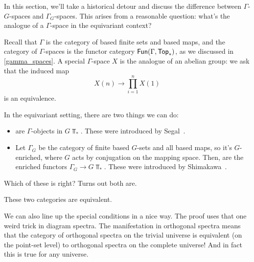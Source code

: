 \label{equivariant_gamma_space}
In this section, we'll take a historical detour and discuss the difference between $\Gamma$-$G$-spaces and
$\Gamma_G$-spaces. This arises from a reasonable question: what's the analogue of a $\Gamma$-space in the
equivariant context?

Recall that $\Gamma$ is the category of based finite sets and based maps, and the category of $\Gamma$-spaces is
the functor category $\mathsf{Fun}(\Gamma, \mathsf{Top}_*)$, as we discussed in \cref{gamma_spaces}. A special $\Gamma$-space $X$
is the analogue of an abelian group: we ask that the induced map
\[X(n)\longrightarrow\prod_{i=1}^n X(1)\]
is an equivalence.

In the equivariant setting, there are two things we can do:
\begin{itemize}
	\item {} are $\Gamma$-objects in $G\Top_*$. These
	were introduced by Segal~\cite{SegalEquivariant}.
	\item Let $\Gamma_G$ be the category of finite based $G$-sets and all based maps, so it's $G$-enriched, where
	$G$ acts by conjugation on the mapping space. Then,  are
	the enriched functors $\Gamma_G\to G\Top_*$. These were introduced by Shimakawa~\cite{Shi89}.
\end{itemize}
Which of these is right? Turns out both are.
\begin{thm}
\label{shimgamma}
These two categories are equivalent.
\end{thm}
We can also line up the special conditions in a nice way. The proof uses that one weird trick in diagram spectra.
The manifestation in orthogonal spectra means that the category of orthogonal spectra on the trivial universe is
equivalent (on the point-set level) to orthogonal spectra on the complete universe! And in fact this is true for
any universe.

